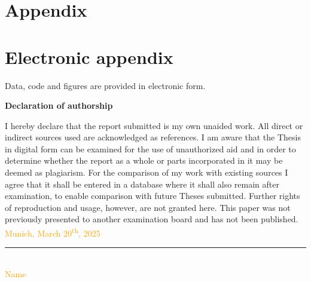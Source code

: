\documentclass[12pt]{article}
\begin{document}
	\newpage
	
	
	
	\setcounter{page}{5} %
	
	\appendix
	
	\section{Appendix}
	\label{app}
	
	\newpage
	
	\section{Electronic appendix}
	\label{el_app}
	
	Data, code and figures are provided in electronic form.
	
	\newpage
	
	
	\RaggedRight
	
	
	\newpage
	
	
	\Large
	\noindent
	\textbf{Declaration of authorship} 
	\vspace{0.5cm}
	\noindent
	\normalsize
	
	I hereby declare that the report submitted is my own unaided work. All direct 
	or indirect sources used are acknowledged as references. I am aware that the 
	Thesis in digital form can be examined for the use of unauthorized aid and in 
	order to determine whether the report as a whole or parts incorporated in it may 
	be deemed as plagiarism. For the comparison of my work with existing sources I 
	agree that it shall be entered in a database where it shall also remain after 
	examination, to enable comparison with future Theses submitted. Further rights 
	of reproduction and usage, however, are not granted here. This paper was not 
	previously presented to another examination board and has not been published.
	\\
	
	\vspace{1cm}
	\textcolor{orange}{Munich, March 20\textsuperscript{th}, 2025 } \\
	
	\vspace{3cm}
	
	\noindent\rule{0.5\textwidth}{0.4pt} \\
	
	\textcolor{orange}{Name}
	
	
\end{document}
